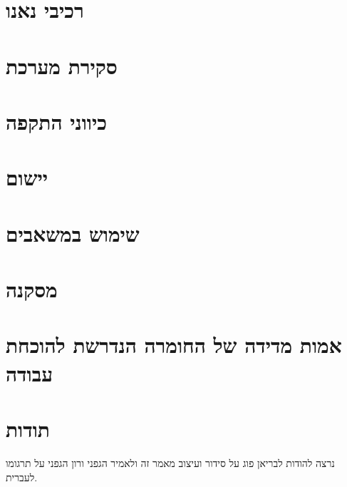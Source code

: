 \documentclass[journal]{IEEEtran}
\begin{document}
\section{רכיבי נאנו}


\section{סקירת מערכת}


\section{כיווני התקפה}


\section{יישום}


\section{שימוש במשאבים}


\section{מסקנה}


\appendices
\section{אמות מדידה של החומרה הנדרשת להוכחת עבודה} \label{sec:pow_hardware_benchmarks}



\section*{תודות}
נרצה להודות לבריאן פוג על סידור ועיצוב מאמר זה ולאמיר הגפני ורון הגפני על תרגומו לעברית.

\ifCLASSOPTIONcaptionsoff
  \newpage
\fi
\end{document}
